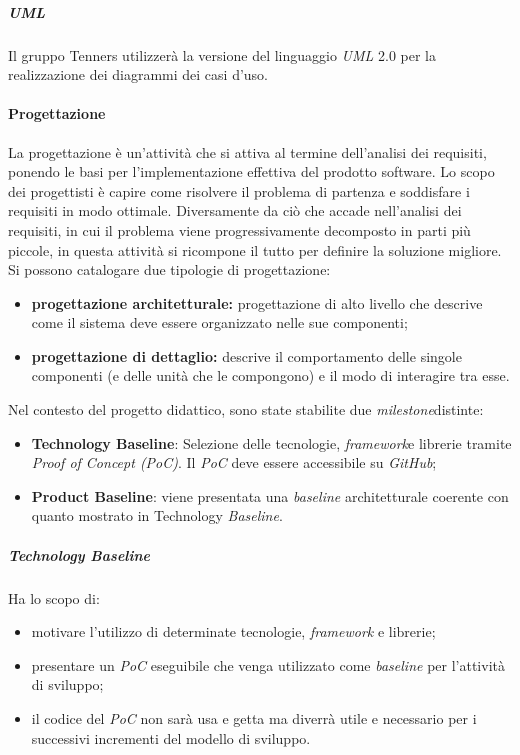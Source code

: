 \subparagraph*{UML\glo}
Il gruppo Tenners utilizzerà la versione del linguaggio \textit{UML\glo} 2.0 per la realizzazione dei diagrammi dei casi d'uso.
\paragraph{Progettazione}
La progettazione è un'attività che si attiva al termine dell'analisi dei requisiti, ponendo le basi per l'implementazione effettiva del prodotto software. Lo scopo dei progettisti è capire come risolvere il problema di partenza e soddisfare i requisiti in modo ottimale. Diversamente da ciò che accade nell'analisi dei requisiti, in cui il problema viene progressivamente decomposto in parti più piccole, in questa attività si ricompone il tutto per definire la soluzione migliore. Si possono catalogare due tipologie di progettazione:
\begin{itemize}
	\item \textbf{progettazione architetturale:} progettazione di alto livello che descrive come il sistema deve essere organizzato nelle sue componenti;
	\item \textbf{progettazione di dettaglio:} descrive il comportamento delle singole componenti (e delle unità che le compongono) e il modo di interagire tra esse.
\end{itemize}
Nel contesto del progetto didattico, sono state stabilite due \textit{milestone}\glo distinte:
\begin{itemize}
	\item \textbf{Technology Baseline\glos}: Selezione delle tecnologie, \textit{framework}\glo e librerie tramite \textit{Proof of Concept (PoC)\glos}. Il \textit{PoC\glo} deve essere accessibile su \textit{GitHub\glos};
	\item \textbf{Product Baseline}: viene presentata una \textit{baseline\glo} architetturale coerente con quanto mostrato in Technology \textit{Baseline\glos}.
\end{itemize}
\subparagraph*{Technology Baseline\glo}
Ha lo scopo di:
\begin{itemize}
	\item motivare l'utilizzo di determinate tecnologie, \textit{framework\glo} e librerie;
	\item presentare un \textit{PoC\glo} eseguibile che venga utilizzato come \textit{baseline\glo} per l'attività di sviluppo;
	\item il codice del \textit{PoC\glo} non sarà usa e getta ma diverrà utile e necessario per i successivi incrementi del modello di sviluppo.
\end{itemize}

